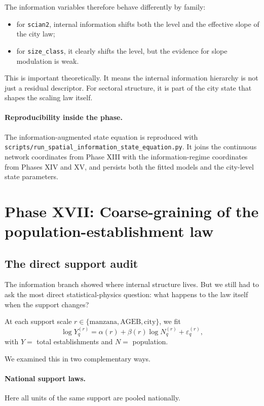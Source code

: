 \documentclass[11pt]{article}
\begin{document}
The information variables therefore behave differently by family:
\begin{itemize}
\item for \texttt{scian2}, internal information shifts both the level and the effective slope of the city law;
\item for \texttt{size\_class}, it clearly shifts the level, but the evidence for slope modulation is weak.
\end{itemize}

This is important theoretically. It means the internal information hierarchy is not just a residual descriptor. For sectoral structure, it is part of the city state that shapes the scaling law itself.

\paragraph{Reproducibility inside the phase.}
The information-augmented state equation is reproduced with
\texttt{scripts/run\_spatial\_information\_state\_equation.py}.
It joins the continuous network coordinates from Phase XIII with the information-regime coordinates from Phases XIV and XV, and persists both the fitted models and the city-level state parameters.

\section{Phase XVII: Coarse-graining of the population-establishment law}

\subsection{The direct support audit}

The information branch showed where internal structure lives. But we still had to ask the most direct statistical-physics question: what happens to the law itself when the support changes?

At each support scale \(r\in\{\text{manzana},\text{AGEB},\text{city}\}\), we fit
\begin{equation}
\log Y_q^{(r)} = \alpha(r) + \beta(r)\log N_q^{(r)} + \varepsilon_q^{(r)},
\label{eq:support-law}
\end{equation}
with \(Y=\) total establishments and \(N=\) population.

We examined this in two complementary ways.

\paragraph{National support laws.}
Here all units of the same support are pooled nationally.
\end{document}
